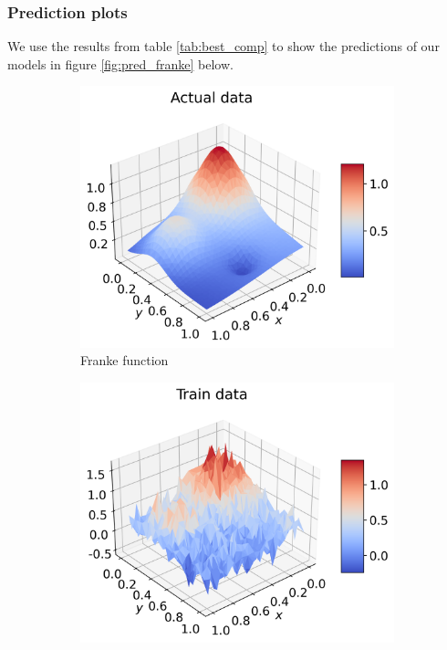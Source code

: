 \documentclass[12pt]{article}
\begin{document}
\subsubsection{Prediction plots}
We use the results from table \ref{tab:best_comp} to show the predictions of our models in figure \ref{fig:pred_franke} below.
\begin{figure}[H]
  \begin{subfigure}{.5\textwidth}
    \centering
    \includegraphics[width=\textwidth]{../figures/actual_data_franke_2.png}
    \caption{Franke function}
    \label{fig:pred_real}
  \end{subfigure}
  \begin{subfigure}{.5\textwidth}
    \centering
    \includegraphics[width=\textwidth]{../figures/train_data_franke_2.png}

\end{subfigure}
\end{figure}
\end{document}
